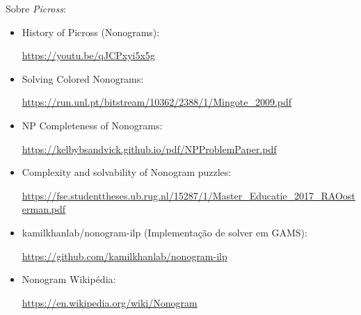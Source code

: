 \documentclass{article}
\begin{document}
Sobre \emph{Picross}:
\begin{itemize}
    \item History of Picross (Nonograms): \par
        \url{https://youtu.be/qJCPxyi5x5g}
    \item Solving Colored Nonograms: \par
        \url{https://run.unl.pt/bitstream/10362/2388/1/Mingote_2009.pdf}
    \item NP Completeness of Nonograms: \par
        \url{https://kelbybsandvick.github.io/pdf/NPProblemPaper.pdf}
    \item Complexity and solvability of Nonogram puzzles: \par
        \url{https://fse.studenttheses.ub.rug.nl/15287/1/Master_Educatie_2017_RAOosterman.pdf}
    \item kamilkhanlab/nonogram-ilp
        (Implementação de solver em GAMS): \par
        \url{https://github.com/kamilkhanlab/nonogram-ilp}
    \item Nonogram Wikipédia: \par
        \url{https://en.wikipedia.org/wiki/Nonogram}
\end{itemize}
\end{document}
